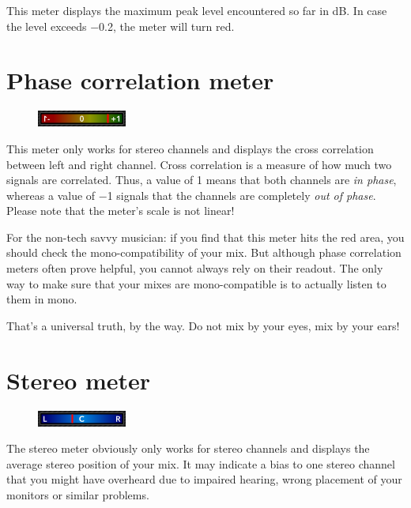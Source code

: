 This meter displays the maximum peak level encountered so far in
\si{\dB}.  In case the level exceeds \SI{-0.2}{\dBFS}, the meter will
turn red.

\section{Phase correlation meter}

\begin{figure}
\includegraphics[scale=\screenshotscale,clip]{include/images/phase_correlation_meter.png}
\end{figure}

This meter only works for stereo channels and displays the cross
correlation between left and right channel.  Cross correlation is a
measure of how much two signals are correlated.  Thus, a value of
\num[retainplus]{+1} means that both channels are \emph{in phase},
whereas a value of \num{-1} signals that the channels are completely
\emph{out of phase}.  Please note that the meter's scale is not
linear!

For the non-tech savvy musician: if you find that this meter hits the
red area, you should check the mono-compatibility of your mix.  But
although phase correlation meters often prove helpful, you cannot
always rely on their readout.  The only way to make sure that your
mixes are mono-compatible is to actually listen to them in mono.

That's a universal truth, by the way.  Do not mix by your eyes, mix by
your ears!

\section{Stereo meter}

\begin{figure}
\includegraphics[scale=\screenshotscale,clip]{include/images/stereo_meter.png}
\end{figure}

The stereo meter obviously only works for stereo channels and displays
the average stereo position of your mix.  It may indicate a bias to
one stereo channel that you might have overheard due to impaired
hearing, wrong placement of your monitors or similar problems.

